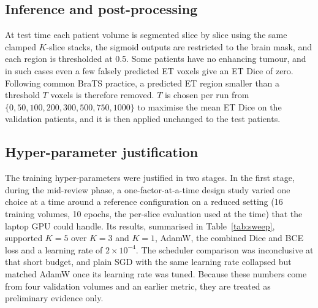 \subsection{Inference and post-processing}
At test time each patient volume is segmented slice by slice using the same clamped $K$-slice stacks, the sigmoid outputs are restricted to the brain mask, and each region is thresholded at 0.5. Some patients have no enhancing tumour, and in such cases even a few falsely predicted ET voxels give an ET Dice of zero. Following common BraTS practice, a predicted ET region smaller than a threshold $T$ voxels is therefore removed. $T$ is chosen per run from $\{0, 50, 100, 200, 300, 500, 750, 1000\}$ to maximise the mean ET Dice on the validation patients, and it is then applied unchanged to the test patients.

\subsection{Hyper-parameter justification}
The training hyper-parameters were justified in two stages. In the first stage, during the mid-review phase, a one-factor-at-a-time design study varied one choice at a time around a reference configuration on a reduced setting (16 training volumes, 10 epochs, the per-slice evaluation used at the time) that the laptop GPU could handle. Its results, summarised in Table~\ref{tab:sweep}, supported $K=5$ over $K=3$ and $K=1$, AdamW, the combined Dice and BCE loss and a learning rate of $2 \times 10^{-4}$. The scheduler comparison was inconclusive at that short budget, and plain SGD with the same learning rate collapsed but matched AdamW once its learning rate was tuned. Because these numbers come from four validation volumes and an earlier metric, they are treated as preliminary evidence only.

\begin{table}[htbp]\centering\small
\caption{Preliminary one-factor-at-a-time design study (mid-review protocol: 16 training volumes, 10 epochs, per-slice validation Dice)}\label{tab:sweep}
\end{table}

